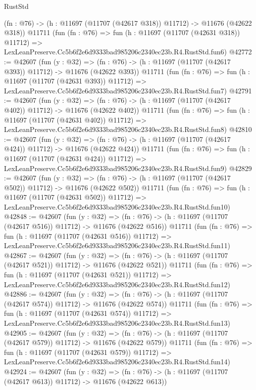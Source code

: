 \begin{lexlean}{RustStd}
\begin{coremodule}
    (fn : @76) -> (h : @11697 (@11707 (@42617 @318)) @11712) -> @11676 (@42622 @318))
    @11711
    (fun (fn : @76) =>
    fun (h : @11697 (@11707 (@42631 @318)) @11712) =>
    LexLeanPreserve.Cc5b6f2e6d9333bad985206c2340ec23b.R4.RustStd.fun6)
@42772 := @42607
    (fun (y : @32) =>
    (fn : @76) -> (h : @11697 (@11707 (@42617 @393)) @11712) -> @11676 (@42622 @393))
    @11711
    (fun (fn : @76) =>
    fun (h : @11697 (@11707 (@42631 @393)) @11712) =>
    LexLeanPreserve.Cc5b6f2e6d9333bad985206c2340ec23b.R4.RustStd.fun7)
@42791 := @42607
    (fun (y : @32) =>
    (fn : @76) -> (h : @11697 (@11707 (@42617 @402)) @11712) -> @11676 (@42622 @402))
    @11711
    (fun (fn : @76) =>
    fun (h : @11697 (@11707 (@42631 @402)) @11712) =>
    LexLeanPreserve.Cc5b6f2e6d9333bad985206c2340ec23b.R4.RustStd.fun8)
@42810 := @42607
    (fun (y : @32) =>
    (fn : @76) -> (h : @11697 (@11707 (@42617 @424)) @11712) -> @11676 (@42622 @424))
    @11711
    (fun (fn : @76) =>
    fun (h : @11697 (@11707 (@42631 @424)) @11712) =>
    LexLeanPreserve.Cc5b6f2e6d9333bad985206c2340ec23b.R4.RustStd.fun9)
@42829 := @42607
    (fun (y : @32) =>
    (fn : @76) -> (h : @11697 (@11707 (@42617 @502)) @11712) -> @11676 (@42622 @502))
    @11711
    (fun (fn : @76) =>
    fun (h : @11697 (@11707 (@42631 @502)) @11712) =>
    LexLeanPreserve.Cc5b6f2e6d9333bad985206c2340ec23b.R4.RustStd.fun10)
@42848 := @42607
    (fun (y : @32) =>
    (fn : @76) -> (h : @11697 (@11707 (@42617 @516)) @11712) -> @11676 (@42622 @516))
    @11711
    (fun (fn : @76) =>
    fun (h : @11697 (@11707 (@42631 @516)) @11712) =>
    LexLeanPreserve.Cc5b6f2e6d9333bad985206c2340ec23b.R4.RustStd.fun11)
@42867 := @42607
    (fun (y : @32) =>
    (fn : @76) -> (h : @11697 (@11707 (@42617 @521)) @11712) -> @11676 (@42622 @521))
    @11711
    (fun (fn : @76) =>
    fun (h : @11697 (@11707 (@42631 @521)) @11712) =>
    LexLeanPreserve.Cc5b6f2e6d9333bad985206c2340ec23b.R4.RustStd.fun12)
@42886 := @42607
    (fun (y : @32) =>
    (fn : @76) -> (h : @11697 (@11707 (@42617 @574)) @11712) -> @11676 (@42622 @574))
    @11711
    (fun (fn : @76) =>
    fun (h : @11697 (@11707 (@42631 @574)) @11712) =>
    LexLeanPreserve.Cc5b6f2e6d9333bad985206c2340ec23b.R4.RustStd.fun13)
@42905 := @42607
    (fun (y : @32) =>
    (fn : @76) -> (h : @11697 (@11707 (@42617 @579)) @11712) -> @11676 (@42622 @579))
    @11711
    (fun (fn : @76) =>
    fun (h : @11697 (@11707 (@42631 @579)) @11712) =>
    LexLeanPreserve.Cc5b6f2e6d9333bad985206c2340ec23b.R4.RustStd.fun14)
@42924 := @42607
    (fun (y : @32) =>
    (fn : @76) -> (h : @11697 (@11707 (@42617 @613)) @11712) -> @11676 (@42622 @613))

\end{coremodule}
\end{lexlean}
